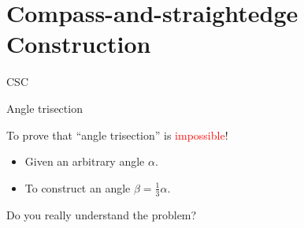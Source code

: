 \section{Compass-and-straightedge Construction}

\begin{frame}{CSC}
\end{frame}

\begin{frame}{Angle trisection}
  \centerline{To prove that ``angle trisection'' is \textcolor{red}{\large impossible}!}

  \vspace{0.50cm}
  \pause

  \begin{itemize}
    \item Given an arbitrary angle $\alpha$.
    \item To construct an angle $\beta = \frac{1}{3} \alpha$.
  \end{itemize}

  \vspace{1.00cm}
  \pause
  \centerline{Do you really understand the problem?}
\end{frame}

